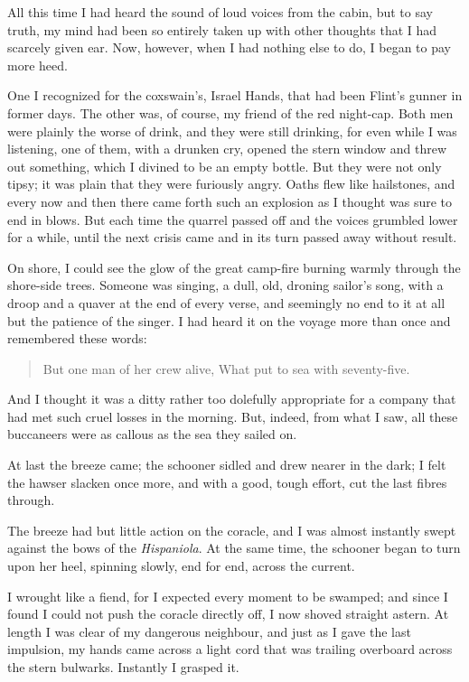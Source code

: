 All this time I had heard the sound of loud voices from the cabin, but to say truth, my mind had been so entirely taken up with other thoughts that I had scarcely given ear. Now, however, when I had nothing else to do, I began to pay more heed.

One I recognized for the coxswain's, Israel Hands, that had been Flint's gunner in former days. The other was, of course, my friend of the red night-cap. Both men were plainly the worse of drink, and they were still drinking, for even while I was listening, one of them, with a drunken cry, opened the stern window and threw out something, which I divined to be an empty bottle. But they were not only tipsy; it was plain that they were furiously angry. Oaths flew like hailstones, and every now and then there came forth such an explosion as I thought was sure to end in blows. But each time the quarrel passed off and the voices grumbled lower for a while, until the next crisis came and in its turn passed away without result.

On shore, I could see the glow of the great camp-fire burning warmly through the shore-side trees. Someone was singing, a dull, old, droning sailor's song, with a droop and a quaver at the end of every verse, and seemingly no end to it at all but the patience of the singer. I had heard it on the voyage more than once and remembered these words:

\blockquote{But one man of her crew alive,
What put to sea with seventy-five.}

And I thought it was a ditty rather too dolefully appropriate for a company that had met such cruel losses in the morning. But, indeed, from what I saw, all these buccaneers were as callous as the sea they sailed on.

At last the breeze came; the schooner sidled and drew nearer in the dark; I felt the hawser slacken once more, and with a good, tough effort, cut the last fibres through.

The breeze had but little action on the coracle, and I was almost instantly swept against the bows of the \textit{Hispaniola}. At the same time, the schooner began to turn upon her heel, spinning slowly, end for end, across the current.

I wrought like a fiend, for I expected every moment to be swamped; and since I found I could not push the coracle directly off, I now shoved straight astern. At length I was clear of my dangerous neighbour, and just as I gave the last impulsion, my hands came across a light cord that was trailing overboard across the stern bulwarks. Instantly I grasped it.

